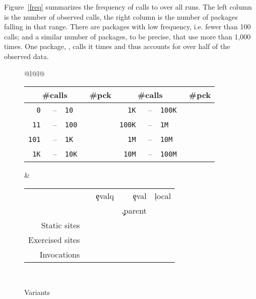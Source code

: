 \documentclass[USenglish,cleveref, autoref, thm-restate]{lipics-v2019}
\begin{document}
Figure~\ref{freq} summarizes the frequency of calls to \eval over all
runs. The left column is the number of observed calls, the right
column is the number of packages falling in that range. There are
\Fewcalls packages with low \eval frequency, i.e. fewer than 100
calls; and a similar number of packages, \Manycalls to be precise,
that use \eval more than 1,000 times. One package, \Maxcallspack,
calls it \Maxcalls times and thus accounts for over half of the
observed data.

\begin{figure}[!h]

\begin{tabular}{@{}l@{\hspace{1.5cm}}l@{}}
\begin{minipage} {5cm}
  \begin{tabular}{|r@{\,}r@{\,}l@{}r|r@{\,}r@{\,}l@{}r|} \hline
    \multicolumn{3}{|c}{\small\#calls} &\small \#pck
&     \multicolumn{3}{c}{\small\#calls} &\small\#pck \\\hline
\tt 0 &--& \tt 10      & \Bina  & \tt 1K &--&\tt 100K  & \Bine\\
\tt 11 &--& \tt 100    & \Binb  & \tt 100K &--&\tt 1M  & \Binf\\
\tt 101 &--& \tt 1K    & \Binc  & \tt 1M &--&\tt 10M   & \Bing\\
\tt 1K &--& \tt 10K    & \Bind  & \tt 10M &--& \tt 100M & \Binh\\\hline
\end{tabular}
\caption{Call frequency}\label{freq}
\end{minipage}
&
\begin{minipage}{7cm}
\begin{tabular}{|@{\,}r@{\,}|@{\,}rrrr@{\,}|}\hline
  &\eval & \c{evalq} & \c{eval} & \c{local}\\[-2mm]
           & & & \c{.parent} &\\\hline
\small Static sites &\Staticeval&\Staticevalq&\Staticevalparent&\Staticlocal \\
\small Exercised sites&\Triggeredeval&\Triggeredevalq&\Triggeredevalparent&\Triggeredlocal\\
\small Invocations&\EvalsRnd&\EvalqsRnd&\EparentsRnd&\LocalsRnd\\\hline
\end{tabular}~\\[2mm]\caption{Variants}\label{tab:variantseval}
\end{minipage}
\end{tabular}
\end{figure}
\end{document}
